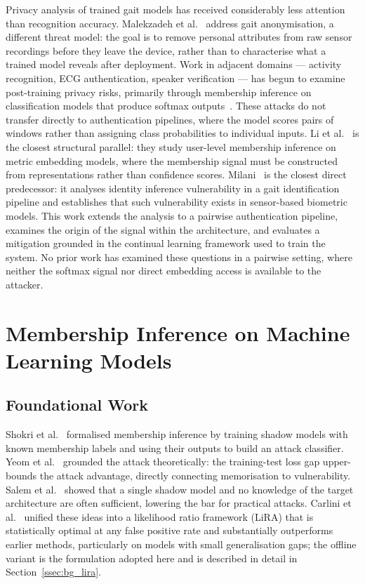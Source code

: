 Privacy analysis of trained gait models has received considerably less attention than recognition accuracy. Malekzadeh et al.~\cite{malekzadeh2018mobile} address gait anonymisation, a different threat model: the goal is to remove personal attributes from raw sensor recordings before they leave the device, rather than to characterise what a trained model reveals after deployment. Work in adjacent domains — activity recognition, ECG authentication, speaker verification — has begun to examine post-training privacy risks, primarily through membership inference on classification models that produce softmax outputs~\cite{shokri2017membership}. These attacks do not transfer directly to authentication pipelines, where the model scores pairs of windows rather than assigning class probabilities to individual inputs. Li et al.~\cite{li2022userlevel} is the closest structural parallel: they study user-level membership inference on metric embedding models, where the membership signal must be constructed from representations rather than confidence scores. Milani~\cite{milani2024gait} is the closest direct predecessor: it analyses identity inference vulnerability in a gait identification pipeline and establishes that such vulnerability exists in sensor-based biometric models. This work extends the analysis to a pairwise authentication pipeline, examines the origin of the signal within the architecture, and evaluates a mitigation grounded in the continual learning framework used to train the system. No prior work has examined these questions in a pairwise setting, where neither the softmax signal nor direct embedding access is available to the attacker.

\section{Membership Inference on Machine Learning Models}
\label{sec:rel_mia_biometric}

\subsection{Foundational Work}
\label{ssec:rel_mia_foundations}

Shokri et al.~\cite{shokri2017membership} formalised membership inference by training shadow models with known membership labels and using their outputs to build an attack classifier. Yeom et al.~\cite{yeom2018privacy} grounded the attack theoretically: the training-test loss gap upper-bounds the attack advantage, directly connecting memorisation to vulnerability. Salem et al.~\cite{salem2019ml} showed that a single shadow model and no knowledge of the target architecture are often sufficient, lowering the bar for practical attacks. Carlini et al.~\cite{carlini2022membership} unified these ideas into a likelihood ratio framework (LiRA) that is statistically optimal at any false positive rate and substantially outperforms earlier methods, particularly on models with small generalisation gaps; the offline variant is the formulation adopted here and is described in detail in Section~\ref{ssec:bg_lira}.

